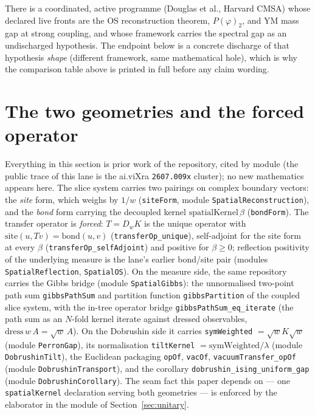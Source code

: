 \documentclass[11pt]{article}
\newcommand{\lean}[1]{\texttt{#1}}
\begin{document}
There is a coordinated, active programme (Douglas et al., Harvard CMSA)
whose declared live fronts are the OS reconstruction theorem,
$P(\varphi)_2$, and YM mass gap at strong coupling, and whose framework
carries the spectral gap as an undischarged hypothesis.  The endpoint
below is a concrete discharge of that hypothesis \emph{shape}
(different framework, same mathematical hole), which is why the
comparison table above is printed in full before any claim wording.

\section{The two geometries and the forced operator}\label{sec:forced}
Everything in this section is prior work of the repository, cited by
module (the public trace of this lane is the ai.viXra
\lean{2607.009x} cluster); no new mathematics appears here.  The slice
system carries two pairings on complex boundary vectors: the
\emph{site} form, which weighs by $1/w$
(\lean{siteForm}, module \lean{SpatialReconstruction}), and the
\emph{bond} form carrying the decoupled kernel
$\mathrm{spatialKernel}\,\beta$ (\lean{bondForm}).  The transfer
operator is \emph{forced}: $T = D_w K$ is the unique operator with
$\mathrm{site}(u, Tv) = \mathrm{bond}(u,v)$
(\lean{transferOp\_unique}), self-adjoint for the site form at every
$\beta$ (\lean{transferOp\_selfAdjoint}) and positive for
$\beta \ge 0$; reflection positivity of the underlying measure is the
lane's earlier bond/site pair (modules \lean{SpatialReflection},
\lean{SpatialOS}).  On the measure side, the same repository carries
the Gibbs bridge (module \lean{SpatialGibbs}): the unnormalised
two-point path sum \lean{gibbsPathSum} and partition function
\lean{gibbsPartition} of the coupled slice system, with the in-tree
operator bridge \lean{gibbsPathSum\_eq\_iterate} (the path sum as an
$N$-fold kernel iterate against dressed observables,
$\mathrm{dress}\,w\,A = \sqrt{w}\,A$).  On the Dobrushin side it
carries \lean{symWeighted} $= \sqrt{w}K\sqrt{w}$ (module
\lean{PerronGap}), its normalisation \lean{tiltKernel}
$= \mathrm{symWeighted}/\lambda$ (module \lean{DobrushinTilt}), the
Euclidean packaging \lean{opOf}, \lean{vacOf},
\lean{vacuumTransfer\_opOf} (module \lean{DobrushinTransport}), and
the corollary \lean{dobrushin\_ising\_uniform\_gap} (module
\lean{DobrushinCorollary}).  The seam fact this paper depends on ---
one \lean{spatialKernel} declaration serving both geometries --- is
enforced by the elaborator in the module of
Section~\ref{sec:unitary}.
\end{document}
